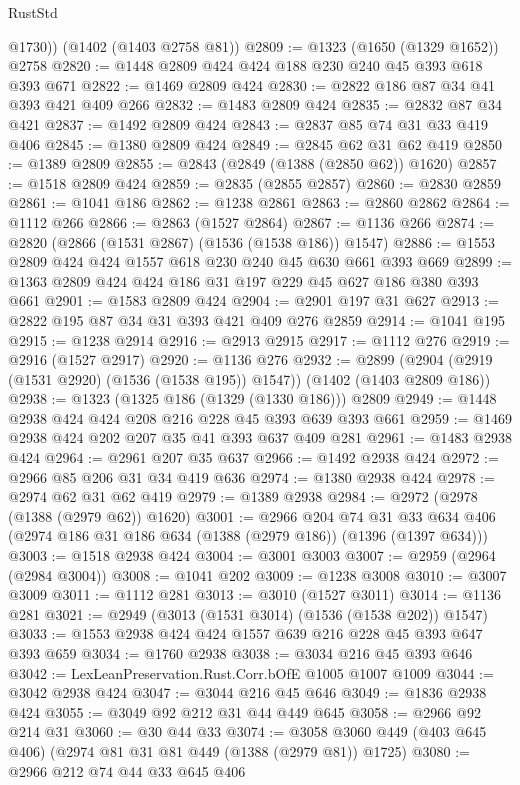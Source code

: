 \begin{lexlean}{RustStd}
\begin{coremodule}
        @1730))
    (@1402 (@1403 @2758 @81))
@2809 := @1323 (@1650 (@1329 @1652)) @2758
@2820 := @1448 @2809 @424 @424 @188 @230 @240 @45 @393 @618 @393 @671
@2822 := @1469 @2809 @424
@2830 := @2822 @186 @87 @34 @41 @393 @421 @409 @266
@2832 := @1483 @2809 @424
@2835 := @2832 @87 @34 @421
@2837 := @1492 @2809 @424
@2843 := @2837 @85 @74 @31 @33 @419 @406
@2845 := @1380 @2809 @424
@2849 := @2845 @62 @31 @62 @419
@2850 := @1389 @2809
@2855 := @2843 (@2849 (@1388 (@2850 @62)) @1620)
@2857 := @1518 @2809 @424
@2859 := @2835 (@2855 @2857)
@2860 := @2830 @2859
@2861 := @1041 @186
@2862 := @1238 @2861
@2863 := @2860 @2862
@2864 := @1112 @266
@2866 := @2863 (@1527 @2864)
@2867 := @1136 @266
@2874 := @2820 (@2866 (@1531 @2867) (@1536 (@1538 @186)) @1547)
@2886 := @1553 @2809 @424 @424 @1557 @618 @230 @240 @45 @630 @661 @393 @669
@2899 := @1363 @2809 @424 @424 @186 @31 @197 @229 @45 @627 @186 @380 @393 @661
@2901 := @1583 @2809 @424
@2904 := @2901 @197 @31 @627
@2913 := @2822 @195 @87 @34 @31 @393 @421 @409 @276 @2859
@2914 := @1041 @195
@2915 := @1238 @2914
@2916 := @2913 @2915
@2917 := @1112 @276
@2919 := @2916 (@1527 @2917)
@2920 := @1136 @276
@2932 := @2899 (@2904 (@2919 (@1531 @2920) (@1536 (@1538 @195)) @1547)) (@1402 (@1403 @2809 @186))
@2938 := @1323 (@1325 @186 (@1329 (@1330 @186))) @2809
@2949 := @1448 @2938 @424 @424 @208 @216 @228 @45 @393 @639 @393 @661
@2959 := @1469 @2938 @424 @202 @207 @35 @41 @393 @637 @409 @281
@2961 := @1483 @2938 @424
@2964 := @2961 @207 @35 @637
@2966 := @1492 @2938 @424
@2972 := @2966 @85 @206 @31 @34 @419 @636
@2974 := @1380 @2938 @424
@2978 := @2974 @62 @31 @62 @419
@2979 := @1389 @2938
@2984 := @2972 (@2978 (@1388 (@2979 @62)) @1620)
@3001 := @2966
    @204
    @74
    @31
    @33
    @634
    @406
    (@2974 @186 @31 @186 @634 (@1388 (@2979 @186)) (@1396 (@1397 @634)))
@3003 := @1518 @2938 @424
@3004 := @3001 @3003
@3007 := @2959 (@2964 (@2984 @3004))
@3008 := @1041 @202
@3009 := @1238 @3008
@3010 := @3007 @3009
@3011 := @1112 @281
@3013 := @3010 (@1527 @3011)
@3014 := @1136 @281
@3021 := @2949 (@3013 (@1531 @3014) (@1536 (@1538 @202)) @1547)
@3033 := @1553 @2938 @424 @424 @1557 @639 @216 @228 @45 @393 @647 @393 @659
@3034 := @1760 @2938
@3038 := @3034 @216 @45 @393 @646
@3042 := LexLeanPreservation.Rust.Corr.bOfE @1005 @1007 @1009
@3044 := @3042 @2938 @424
@3047 := @3044 @216 @45 @646
@3049 := @1836 @2938 @424
@3055 := @3049 @92 @212 @31 @44 @449 @645
@3058 := @2966 @92 @214 @31
@3060 := @30 @44 @33
@3074 := @3058 @3060 @449 (@403 @645 @406) (@2974 @81 @31 @81 @449 (@1388 (@2979 @81)) @1725)
@3080 := @2966 @212 @74 @44 @33 @645 @406

\end{coremodule}
\end{lexlean}
